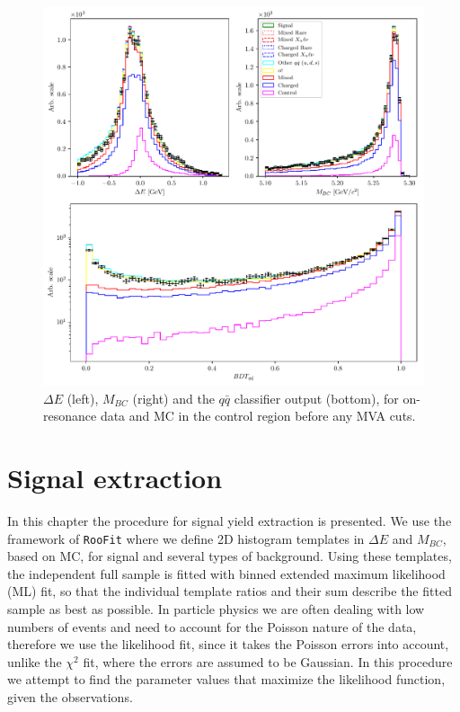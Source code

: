 \documentclass[headings=standardclasses,headings=big,oneside,a4paper,openany,12pt]{scrbook}
\newcommand {\vars}{$\Delta E$ and $M_{BC}$}
\begin{document}
\begin{figure}[H]
\centering
\captionsetup{width=0.8\linewidth}
\includegraphics[width=\linewidth]{fig/onres_control}
\caption{$\Delta E$ (left), $M_{BC}$ (right) and the $q \bar q$ classifier output (bottom), for on-resonance data and MC in the control region before any MVA cuts.}
\label{fig:onres_control}
\end{figure}

\chapter{Signal extraction}
In this chapter the procedure for signal yield extraction is presented. We use the framework of \texttt{RooFit} \cite{verkerke2006roofit} where we define 2D histogram templates in \vars, based on MC, for signal and several types of background. Using these templates, the independent full sample is fitted with binned extended maximum likelihood (ML) fit, so that the individual template ratios and their sum describe the fitted sample as best as possible. In particle physics we are often dealing with low numbers of events and need to account for the Poisson nature of the data, therefore we use the likelihood fit, since it takes the Poisson errors into account, unlike the $\chi^2$ fit, where the errors are assumed to be Gaussian. In this procedure we attempt to find the parameter values that maximize the likelihood function, given the observations.
\end{document}
